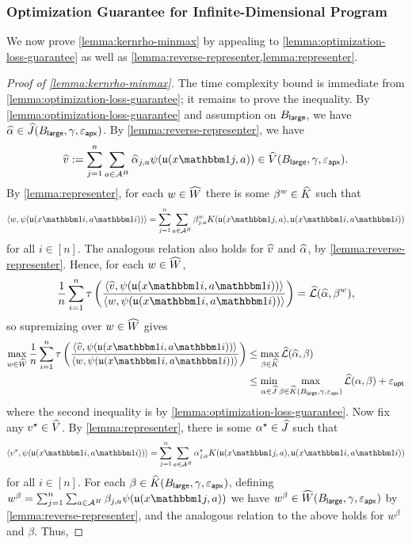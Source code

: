 \subsubsection{Optimization Guarantee for Infinite-Dimensional Program}

We now prove \cref{lemma:kernrho-minmax} by appealing to \cref{lemma:optimization-loss-guarantee} as well as \cref{lemma:reverse-representer,lemma:representer}.\vspace{0.5em}

\begin{proof}[Proof of \cref{lemma:kernrho-minmax}]
The time complexity bound is immediate from \cref{lemma:optimization-loss-guarantee}; it remains to prove the inequality. By \cref{lemma:optimization-loss-guarantee} and assumption on $B_{\mathsf{large}}$, we have $\widehat{\alpha} \in \widehat{J}(B_{\mathsf{large}},\gamma,\varepsilon_{\mathsf{apx}})$. By \cref{lemma:reverse-representer}, we have \[\wh v := \sum_{j=1}^n \sum_{a \in \MA^H} \wh\alpha_{j,a} \psi(\uop{x\ind{j}}{a}) \in  \wh V(\Blarge,\gamma,\epapx).\] 
By \cref{lemma:representer}, for each $w \in \widehat{W}$ there is some $\beta^w \in \widehat{K}$ such that 
\[\langle w, \psi(\uop{x\ind{i}}{a\ind{i}})\rangle = \sum_{j=1}^n \sum_{a \in \MA^H} \beta^w_{j,a} K(\uop{x\ind{j}}{a},\uop{x\ind{i}}{a\ind{i}})\]
for all $i \in [n]$. The analogous relation also holds for $\widehat{v}$ and $\widehat{\alpha}$, by \cref{lemma:reverse-representer}. Hence, for each $w \in \widehat{W}$,
\[\frac{1}{n} \sum_{i=1}^n \tau\left(\frac{\langle \wh v, \psi(\uop{x\ind{i}}{a\ind{i}})\rangle}{\langle w, \psi(\uop{x\ind{i}}{a\ind{i}})\rangle}\right) = \emploss(\wh \alpha, \beta^w),\]
so supremizing over $w \in \widehat{W}$ gives
\begin{align} 
\max_{w \in \wh W} \frac{1}{n} \sum_{i=1}^n \tau\left(\frac{\langle \wh v, \psi(\uop{x\ind{i}}{a\ind{i}})\rangle}{\langle w, \psi(\uop{x\ind{i}}{a\ind{i}})\rangle}\right) 
&\leq \max_{\beta \in \wh K} \emploss(\wh \alpha, \beta) \\ 
&\leq \min_{\alpha \in \wh J} \max_{\beta \in \wh K(\Blarge,\gamma,\epapx)} \emploss(\alpha,\beta) + \epopt\label{eq:loss-bound-minmax}
\end{align}
where the second inequality is by \cref{lemma:optimization-loss-guarantee}. Now fix any $v^\star \in \widehat{V}$. By \cref{lemma:representer}, there is some $\alpha^\star \in \widehat{J}$ such that
\[\langle v^\star, \psi(\uop{x\ind{i}}{a\ind{i}})\rangle = \sum_{j=1}^n \sum_{a \in \MA^H} \alpha^\star_{j,a} K(\uop{x\ind{j}}{a},\uop{x\ind{i}}{a\ind{i}})\]
for all $i \in [n]$. For each $\beta \in \widehat{K}(B_{\mathsf{large}},\gamma,\varepsilon_{\mathsf{apx}})$, defining $w^\beta = \sum_{j=1}^n \sum_{a \in \MA^H} \beta_{j,a} \psi(\uop{x\ind{j}}{a})$ we have $w^\beta \in \widehat{W}(B_{\mathsf{large}},\gamma,\varepsilon_{\mathsf{apx}})$ by \cref{lemma:reverse-representer}, and the analogous relation to the above holds for $w^\beta$ and $\beta$. Thus,

\end{proof}
